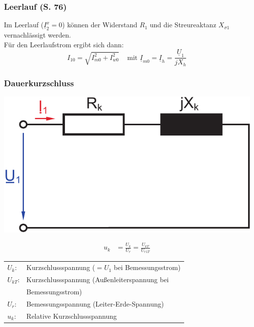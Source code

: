 \documentclass[a4paper,twocolumn,10pt]{article}
\begin{document}
\subsubsection{Leerlauf (S. 76)}
Im Leerlauf ($\underline{I}_2^x=0$) können der Widerstand $R_1$ und die Streureaktanz $X_{\sigma 1}$ vernachlässigt werden.\\
Für den Leerlaufstrom ergibt sich dann:
\begin{equation*}
I_{10}=\sqrt{I_{m0}^2+I_{w0}^2}\;\;\;\text{ mit }\underline{I}_{m0}=\underline{I}_h=\frac{\underline{U}_1}{jX_h}
\end{equation*}

\subsubsection{Dauerkurzschluss}
\begin{center}
\includegraphics[width=0.6\columnwidth]{Grafiken/Trafo_KS_ESB}
\end{center}
\begin{equation*}
\begin{split}
u_k&=\frac{U_k}{U_r}=\frac{U_{kT}}{U_{r1T}}
\end{split}
\end{equation*}
\begin{tabular}{ll}
$U_k$: & Kurzschlussspannung ($=U_1$ bei Bemessungsstrom)\\
$U_{kT}$: & Kurzschlussspannung (Außenleiterspannung bei\\
& Bemessungsstrom)\\
$U_r$: & Bemessungsspannung (Leiter-Erde-Spannung)\\
$u_k$: & Relative Kurzschlussspannung
\end{tabular}
\end{document}
